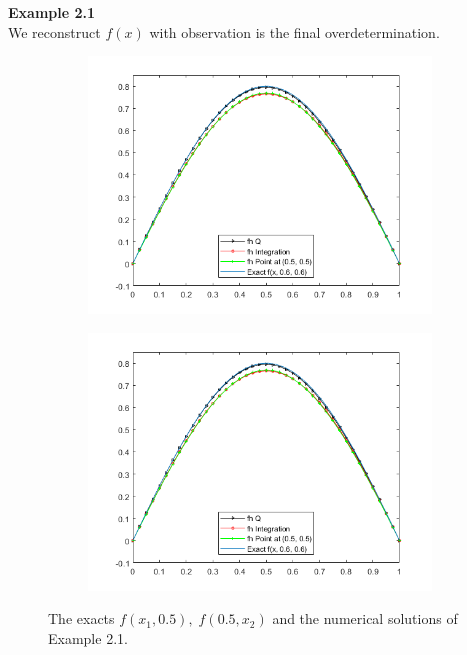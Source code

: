 \documentclass[]{article}
\begin{document}
\noindent\textbf{Example 2.1}
\\
We reconstruct $f(x)$ with observation is the final overdetermination.
\begin{figure}[h!]
	\begin{subfigure}{.5\linewidth}
		\centering
		\includegraphics[width=\linewidth]{../FreeFem++/fhx}
	\end{subfigure}%
	\begin{subfigure}{.5\linewidth}
		\centering
		\includegraphics[width=\linewidth]{../FreeFem++/fhx}
	\end{subfigure}
	\caption{The exacts $f(x_1, 0.5),\; f(0.5, x_2)$ and the numerical solutions of Example 2.1.}
\end{figure}
\end{document}
